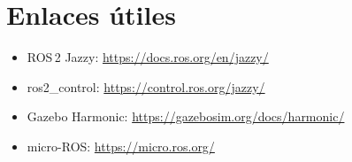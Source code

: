 \documentclass[11pt,a4paper]{article}
\begin{document}
\section{Enlaces útiles}
\begin{itemize}
  \item ROS\,2 Jazzy: \url{https://docs.ros.org/en/jazzy/}
  \item ros2\_control: \url{https://control.ros.org/jazzy/}
  \item Gazebo Harmonic: \url{https://gazebosim.org/docs/harmonic/}
  \item micro-ROS: \url{https://micro.ros.org/}
\end{itemize}
\end{document}
